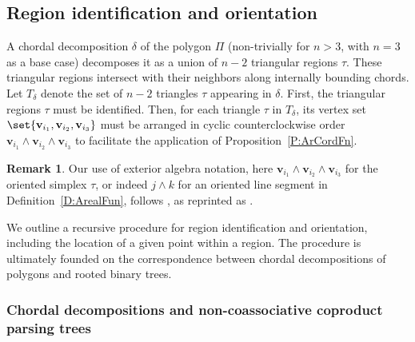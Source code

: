 \documentclass[12pt]{amsart}
\theoremstyle{plain}
\theoremstyle{definition}
\newtheorem{remark}[theorem]{Remark}
\numberwithin{equation}{section}
\begin{document}
\renewcommand{\arraystretch}{1}



\subsection{Region identification and orientation}\label{SSRegnIdOr}



A chordal decomposition $\delta$ of the polygon $\Pi$ (non-trivially for $n>3$, with $n=3$ as a base case) decomposes it as a union of $n-2$ triangular regions $\tau$. These triangular regions intersect with their neighbors along internally bounding chords. Let $T_\delta$ denote the set of $n-2$ triangles $\tau$ appearing in $\delta$. First, the triangular regions $\tau$ must be identified. Then, for each triangle $\tau$ in $T_\delta$, its vertex set $\set{\mathbf v_{i_1},\mathbf v_{i_2},\mathbf v_{i_3}}$ must be arranged in cyclic counterclockwise order $\mathbf v_{i_1}\wedge \mathbf v_{i_2}\wedge \mathbf v_{i_3}$ to facilitate the application of Proposition~\ref{P:ArCordFn}.


\begin{remark}
Our use of exterior algebra notation, here $\mathbf v_{i_1}\wedge \mathbf v_{i_2}\wedge \mathbf v_{i_3}$ for the oriented simplex $\tau$, or indeed $j\wedge k$ for an oriented line segment in Definition~\ref{D:ArealFun}, follows \cite[\S IV.4]{Chevalley1}, as reprinted as \cite[p.62]{Chevalley2}.
\end{remark}


We outline a recursive procedure for region identification and orientation, including the location of a given point within a region. The procedure is ultimately founded on the correspondence between chordal decompositions of polygons and rooted binary trees.


\subsubsection{Chordal decompositions and non-coassociative coproduct parsing trees}\label{SSS:ChDePaTr}
\end{document}
